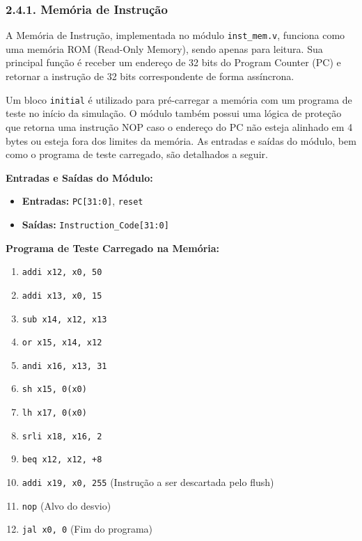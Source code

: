 \documentclass[12pt, a4paper]{article}
\begin{document}
\subsubsection*{2.4.1. Memória de Instrução}

A Memória de Instrução, implementada no módulo \texttt{inst\_mem.v}, funciona como uma memória ROM (Read-Only Memory), sendo apenas para leitura. Sua principal função é receber um endereço de 32 bits do Program Counter (PC) e retornar a instrução de 32 bits correspondente de forma assíncrona.

Um bloco \texttt{initial} é utilizado para pré-carregar a memória com um programa de teste no início da simulação. O módulo também possui uma lógica de proteção que retorna uma instrução NOP caso o endereço do PC não esteja alinhado em 4 bytes ou esteja fora dos limites da memória. As entradas e saídas do módulo, bem como o programa de teste carregado, são detalhados a seguir.

\vspace{0.5cm} %
\textbf{Entradas e Saídas do Módulo:}
\begin{itemize}
    \item \textbf{Entradas:} \texttt{PC[31:0]}, \texttt{reset}
    \item \textbf{Saídas:} \texttt{Instruction\_Code[31:0]}
\end{itemize}

\textbf{Programa de Teste Carregado na Memória:}
\begin{enumerate}
    \item \texttt{addi x12, x0, 50}
    \item \texttt{addi x13, x0, 15}
    \item \texttt{sub  x14, x12, x13}
    \item \texttt{or   x15, x14, x12}
    \item \texttt{andi x16, x13, 31}
    \item \texttt{sh   x15, 0(x0)}
    \item \texttt{lh   x17, 0(x0)}
    \item \texttt{srli x18, x16, 2}
    \item \texttt{beq  x12, x12, +8}
    \item \texttt{addi x19, x0, 255} (Instrução a ser descartada pelo flush)
    \item \texttt{nop} (Alvo do desvio)
    \item \texttt{jal x0, 0} (Fim do programa)
\end{enumerate}
\end{document}
